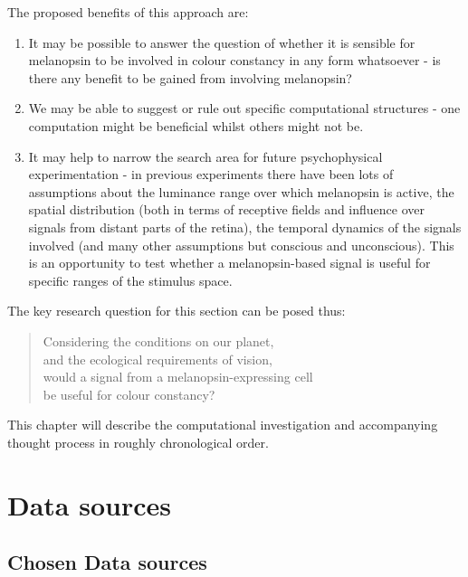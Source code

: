 \noindent The proposed benefits of this approach are: 
\begin{enumerate}
    \item It may be possible to answer the question of whether it is sensible for melanopsin to be involved in colour constancy in any form whatsoever - is there any benefit to be gained from involving melanopsin?
    \item We may be able to suggest or rule out specific computational structures - one computation might be beneficial whilst others might not be.
    \item It may help to narrow the search area for future psychophysical experimentation - in previous experiments there have been lots of assumptions about the luminance range over which melanopsin is active, the spatial distribution (both in terms of receptive fields and influence over signals from distant parts of the retina), the temporal dynamics of the signals involved (and many other assumptions but conscious and unconscious). This is an opportunity to test whether a melanopsin-based signal is useful for specific ranges of the stimulus space.
\end{enumerate}

\noindent The key research question for this section can be posed thus:

\begin{quote}
\centering 
Considering the conditions on our planet, \\
and the ecological requirements of vision, \\
would a signal from a melanopsin-expressing cell \\
be useful for colour constancy?
\end{quote}

This chapter will describe the computational investigation and accompanying thought process in roughly chronological order.

\section{Data sources}



\subsection{Chosen Data sources}

